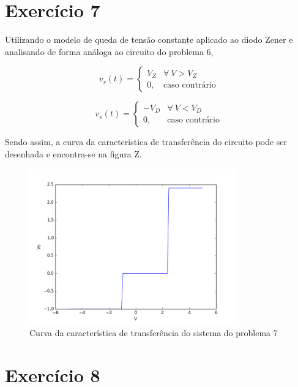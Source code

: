\documentclass[12pt, a4paper, twoside]{article}
\begin{document}
\section{Exercício 7}

Utilizando o modelo de queda de tensão constante aplicado ao diodo Zener e
analisando de forma análoga ao circuito do problema 6,


\begin{equation}
    v_s(t) =
    \begin{cases}
        V_Z & \forall\ V > V_Z \\
        0, & \text{caso contrário}
    \end{cases}
\end{equation}


\begin{equation}
    v_s(t) =
    \begin{cases}
        -V_D & \forall\ V < V_D \\
        0, & \text{caso contrário}
    \end{cases}
\end{equation}

Sendo assim, a curva da característica de transferência do circuito pode ser desenhada
e encontra-se na figura Z.
\begin{figure}
    \centering
    \includegraphics[width=0.8\textwidth]{figs/rel3/ex7.png}
    \caption{Curva da característica de transferência do sistema do problema 7}
\end{figure}

\section{Exercício 8}
\end{document}
